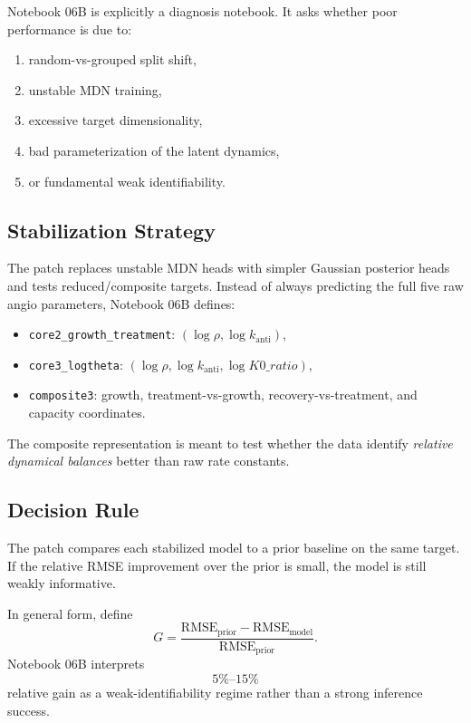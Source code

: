 \documentclass[11pt,a4paper]{article}
\begin{document}
Notebook 06B is explicitly a diagnosis notebook. It asks whether poor performance is due to:
\begin{enumerate}[leftmargin=2em]
    \item random-vs-grouped split shift,
    \item unstable MDN training,
    \item excessive target dimensionality,
    \item bad parameterization of the latent dynamics,
    \item or fundamental weak identifiability.
\end{enumerate}

\subsection{Stabilization Strategy}

The patch replaces unstable MDN heads with simpler Gaussian posterior heads and tests reduced/composite targets. Instead of always predicting the full five raw angio parameters, Notebook 06B defines:
\begin{itemize}[leftmargin=2em]
    \item \texttt{core2\_growth\_treatment}: $(\log\rho,\log k_{\mathrm{anti}})$,
    \item \texttt{core3\_logtheta}: $(\log\rho,\log k_{\mathrm{anti}},\log K0\_ratio)$,
    \item \texttt{composite3}: growth, treatment-vs-growth, recovery-vs-treatment, and capacity coordinates.
\end{itemize}

The composite representation is meant to test whether the data identify \emph{relative dynamical balances} better than raw rate constants.

\subsection{Decision Rule}

The patch compares each stabilized model to a prior baseline on the same target. If the relative RMSE improvement over the prior is small, the model is still weakly informative.

In general form, define
\[
    G
    =
    \frac{\mathrm{RMSE}_{\mathrm{prior}}-\mathrm{RMSE}_{\mathrm{model}}}
    {\mathrm{RMSE}_{\mathrm{prior}}}.
\]
Notebook 06B interprets
\[
    5\%\text{--}15\%
\]
relative gain as a weak-identifiability regime rather than a strong inference success.
\end{document}
